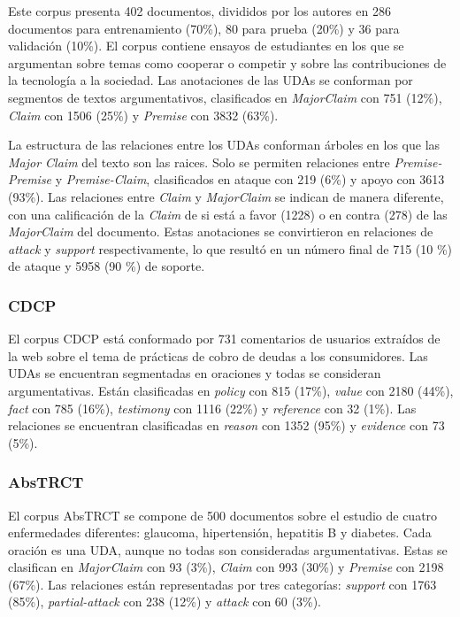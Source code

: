\documentclass{rcci} %
\begin{document}
Este corpus \citep{stab2017parsing} presenta 402 documentos, divididos por los autores en 286 documentos para entrenamiento (70\%), 
80 para prueba (20\%) y 36 para validaci\'on (10\%). El corpus contiene ensayos de estudiantes en los que 
se argumentan sobre temas como cooperar o competir y sobre las contribuciones de la tecnolog\'ia a la sociedad.
Las anotaciones de las UDAs se conforman por segmentos de textos argumentativos,
clasificados en \textit{MajorClaim} con 751 (12\%), \textit{Claim} con 1506 (25\%) y \textit{Premise} con 3832 (63\%).

La estructura de las relaciones entre los UDAs conforman \'arboles en los que las \textit{Major Claim} 
del texto son las raices. Solo se permiten relaciones entre \textit{Premise-Premise} y \textit{Premise-Claim}, 
clasificados en ataque con 219 (6\%) y apoyo con 3613 (93\%). Las relaciones entre \textit{Claim} y \textit{MajorClaim} 
se indican de manera diferente, con una calificaci\'on de la \textit{Claim} de si est\'a a favor (1228) o en contra (278) de las \textit{MajorClaim} 
del documento. Estas anotaciones se convirtieron en relaciones de \textit{attack} y \textit{support} respectivamente, 
lo que result\'o en un n\'umero final de 715 (10 \%) de ataque y 5958 (90 \%) de soporte.

\subsubsection*{CDCP}\label{corpus:cdcp}

El corpus CDCP \citep{niculae2017argument} est\'a conformado por 731 comentarios de usuarios extra\'idos de la web sobre el tema de 
pr\'acticas de cobro de deudas a los consumidores.
Las UDAs se encuentran segmentadas en oraciones y todas se consideran argumentativas.
Est\'an clasificadas en 
\textit{policy} con 815 (17\%), \textit{value} con 2180 (44\%), \textit{fact} con 
785 (16\%), \textit{testimony} con 1116 (22\%) y \textit{reference} con 32 (1\%). 
Las relaciones se encuentran clasificadas en \textit{reason} con 1352 (95\%) y \textit{evidence} con 73 (5\%).

\subsubsection*{AbsTRCT}

El corpus AbsTRCT \citep{mayer2020transformer} se compone de 500 documentos sobre el estudio de cuatro enfermedades diferentes:
glaucoma, hipertensi\'on, hepatitis B y diabetes. Cada oraci\'on es una UDA, aunque no todas son consideradas
argumentativas. Estas se clasifican en \textit{MajorClaim} con 93 (3\%), \textit{Claim} con 993 (30\%) y \textit{Premise} con 2198 (67\%).
Las relaciones est\'an representadas por tres categor\'ias: \textit{support} con 1763 (85\%), \textit{partial-attack} con 238 (12\%) y
\textit{attack} con 60 (3\%).
\end{document}
